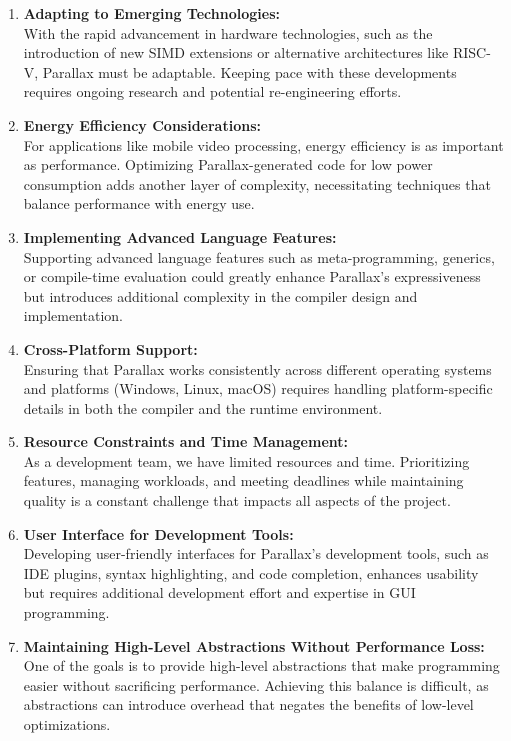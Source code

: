 \documentclass[12pt,a4paper]{article}
\begin{document}
\begin{enumerate}
    \item \textbf{Adapting to Emerging Technologies:} \\
    With the rapid advancement in hardware technologies, such as the introduction of new SIMD extensions or alternative architectures like RISC-V, Parallax must be adaptable. Keeping pace with these developments requires ongoing research and potential re-engineering efforts.

    \item \textbf{Energy Efficiency Considerations:} \\
    For applications like mobile video processing, energy efficiency is as important as performance. Optimizing Parallax-generated code for low power consumption adds another layer of complexity, necessitating techniques that balance performance with energy use.

    \item \textbf{Implementing Advanced Language Features:} \\
    Supporting advanced language features such as meta-programming, generics, or compile-time evaluation could greatly enhance Parallax's expressiveness but introduces additional complexity in the compiler design and implementation.

    \item \textbf{Cross-Platform Support:} \\
    Ensuring that Parallax works consistently across different operating systems and platforms (Windows, Linux, macOS) requires handling platform-specific details in both the compiler and the runtime environment.

    \item \textbf{Resource Constraints and Time Management:} \\
    As a development team, we have limited resources and time. Prioritizing features, managing workloads, and meeting deadlines while maintaining quality is a constant challenge that impacts all aspects of the project.

    \item \textbf{User Interface for Development Tools:} \\
    Developing user-friendly interfaces for Parallax's development tools, such as IDE plugins, syntax highlighting, and code completion, enhances usability but requires additional development effort and expertise in GUI programming.

    \item \textbf{Maintaining High-Level Abstractions Without Performance Loss:} \\
    One of the goals is to provide high-level abstractions that make programming easier without sacrificing performance. Achieving this balance is difficult, as abstractions can introduce overhead that negates the benefits of low-level optimizations.


\end{enumerate}
\end{document}
